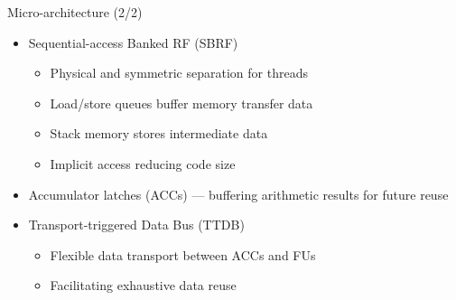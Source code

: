\documentclass{beamer}
\begin{document}
\begin{CJK}{UTF8}{bkai}
    \begin{frame}{Micro-architecture (2/2)}
        \begin{itemize}
            \item Sequential-access Banked RF (SBRF)
                \begin{itemize}
                    \item Physical and symmetric separation for threads
                    \item Load/store queues buffer memory transfer data
                    \item Stack memory stores intermediate data
                    \item Implicit access reducing code size
                \end{itemize}
            \item Accumulator latches (ACCs) --- buffering arithmetic results for future reuse
            \item Transport-triggered Data Bus (TTDB)
                \begin{itemize}
                    \item Flexible data transport between ACCs and FUs
                    \item Facilitating exhaustive data reuse
                \end{itemize}
        \end{itemize}
    \end{frame}


\end{CJK}
\end{document}
